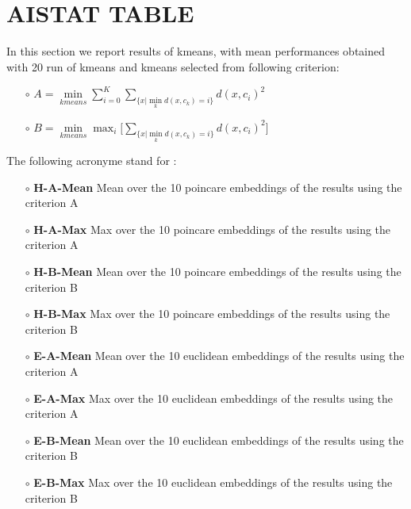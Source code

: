 \documentclass{article}
\begin{document}
\section{AISTAT TABLE}
In this section we report results of kmeans, with mean performances obtained with 20 run of kmeans and kmeans selected from following criterion:

\begin{itemize}
    \item[$\circ$]  $ A = \min\limits_{kmeans} \sum\limits_{i=0}^K \sum\limits_{\{x | \min\limits_k d(x,c_k) = i\}} d(x, c_i)^2$
    \item[$\circ$]  $ B = \min\limits_{kmeans} \max_{i} \Big[ \sum\limits_{\{x | \min\limits_k d(x,c_k) = i\}} d(x, c_i)^2 \Big]$
\end{itemize}

The following acronyme stand for :
\begin{itemize}
    \item[$\circ$] \textbf{H-A-Mean} Mean over the 10 poincare embeddings of the results using the criterion A
    \item[$\circ$] \textbf{H-A-Max } Max over the 10  poincare  embeddings of the results using the criterion A
    \item[$\circ$] \textbf{H-B-Mean} Mean over the 10  poincare  embeddings of the results using the criterion B
    \item[$\circ$] \textbf{H-B-Max } Max over the 10  poincare  embeddings of the results using the criterion B
    \item[$\circ$] \textbf{E-A-Mean} Mean over the 10 euclidean embeddings of the results using the criterion A
    \item[$\circ$] \textbf{E-A-Max } Max over the 10  euclidean  embeddings of the results using the criterion A
    \item[$\circ$] \textbf{E-B-Mean} Mean over the 10  euclidean  embeddings of the results using the criterion B
    \item[$\circ$] \textbf{E-B-Max } Max over the 10  euclidean  embeddings of the results using the criterion B 
\end{itemize}
\end{document}
